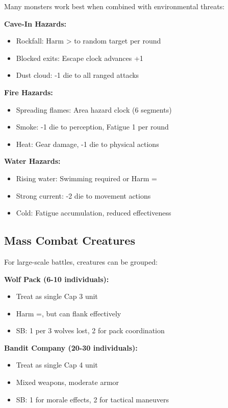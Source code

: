 \documentclass[12pt]{article}
\begin{document}
\begin{itemize}
Many monsters work best when combined with environmental threats:

\textbf{Cave-In Hazards:}
\begin{itemize}
\item Rockfall: Harm > to random target per round
\item Blocked exits: Escape clock advances +1
\item Dust cloud: -1 die to all ranged attacks
\end{itemize}

\textbf{Fire Hazards:}
\begin{itemize}
\item Spreading flames: Area hazard clock (6 segments)
\item Smoke: -1 die to perception, Fatigue 1 per round
\item Heat: Gear damage, -1 die to physical actions
\end{itemize}

\textbf{Water Hazards:}
\begin{itemize}
\item Rising water: Swimming required or Harm =
\item Strong current: -2 die to movement actions
\item Cold: Fatigue accumulation, reduced effectiveness
\end{itemize}

\subsection*{Mass Combat Creatures}

For large-scale battles, creatures can be grouped:

\textbf{Wolf Pack (6-10 individuals):}
\begin{itemize}
\item Treat as single Cap 3 unit
\item Harm =, but can flank effectively
\item SB: 1 per 3 wolves lost, 2 for pack coordination
\end{itemize}

\textbf{Bandit Company (20-30 individuals):}
\begin{itemize}
\item Treat as single Cap 4 unit
\item Mixed weapons, moderate armor
\item SB: 1 for morale effects, 2 for tactical maneuvers
\end{itemize}


\end{itemize}
\end{document}

